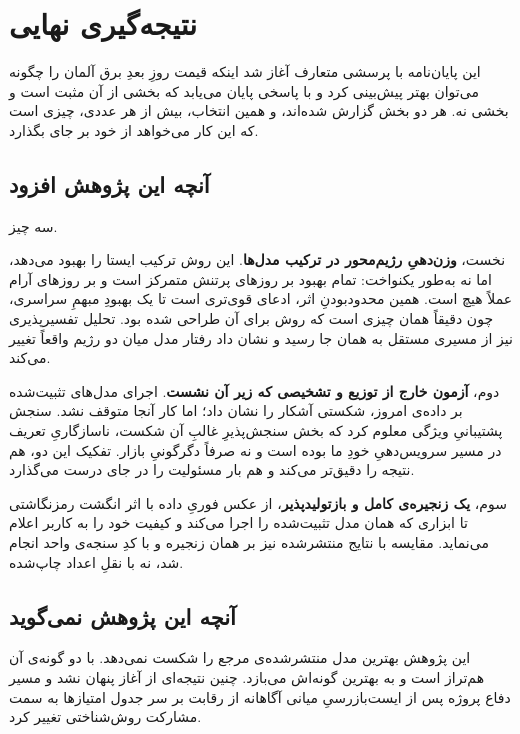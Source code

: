 
\section{نتیجه‌گیری نهایی}
\label{sec:5-5}

این پایان‌نامه با پرسشی متعارف آغاز شد  اینکه قیمت روزِ بعدِ برق آلمان را
چگونه می‌توان بهتر پیش‌بینی کرد  و با پاسخی پایان می‌یابد که بخشی از آن
مثبت است و بخشی نه. هر دو بخش گزارش شده‌اند، و همین انتخاب، بیش از هر عددی،
چیزی است که این کار می‌خواهد از خود بر جای بگذارد.

\subsection*{آنچه این پژوهش افزود}

سه چیز.

نخست، \textbf{وزن‌دهیِ رژیم‌محور در ترکیب مدل‌ها}. این روش ترکیب ایستا را بهبود
می‌دهد، اما نه به‌طور یکنواخت: تمام بهبود بر روزهای پرتنش متمرکز است و بر
روزهای آرام عملاً هیچ است. همین محدودبودنِ اثر، ادعای قوی‌تری است تا یک بهبودِ
مبهمِ سراسری، چون دقیقاً همان چیزی است که روش برای آن طراحی شده بود. تحلیل
تفسیرپذیری نیز از مسیری مستقل به همان جا رسید و نشان داد رفتار مدل میان دو
رژیم واقعاً تغییر می‌کند.

دوم، \textbf{آزمون خارج از توزیع و تشخیصی که زیر آن نشست}. اجرای مدل‌های
تثبیت‌شده بر داده‌ی امروز، شکستی آشکار را نشان داد؛ اما کار آنجا متوقف نشد.
سنجش پشتیبانیِ ویژگی معلوم کرد که بخش سنجش‌پذیرِ غالبِ آن شکست، ناسازگاریِ
تعریف در مسیر سرویس‌دهیِ خودِ ما بوده است و نه صرفاً دگرگونیِ بازار. تفکیک این
دو، هم نتیجه را دقیق‌تر می‌کند و هم بار مسئولیت را در جای درست می‌گذارد.

سوم، \textbf{یک زنجیره‌ی کامل و بازتولیدپذیر}، از عکس فوریِ داده با اثر انگشت
رمزنگاشتی تا ابزاری که همان مدل تثبیت‌شده را اجرا می‌کند و کیفیت خود را به
کاربر اعلام می‌نماید. مقایسه با نتایج منتشرشده نیز بر همان زنجیره و با کدِ
سنجه‌ی واحد انجام شد، نه با نقلِ اعداد چاپ‌شده.

\subsection*{آنچه این پژوهش نمی‌گوید}

این پژوهش بهترین مدل منتشرشده‌ی مرجع را شکست نمی‌دهد. با دو گونه‌ی آن هم‌تراز
است و به بهترین گونه‌اش می‌بازد. چنین نتیجه‌ای از آغاز پنهان نشد و مسیر دفاع پروژه
پس از ایست‌بازرسیِ میانی آگاهانه از رقابت بر سر جدول امتیازها به سمت مشارکت
روش‌شناختی تغییر کرد.

